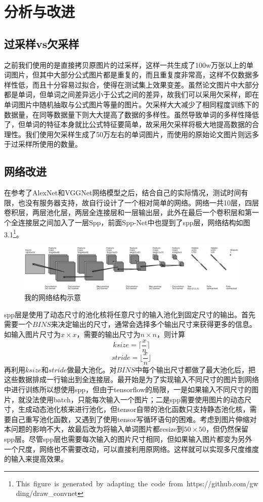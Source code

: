 \chapter{分析与改进}

\section{过采样vs欠采样}

之前我们使用的是直接拷贝原图片的过采样，这样一共生成了100w万张以上的单词图片，但其中大部分公式图片都是重复的，而且重复度非常高，这样不仅数据多样性低，而且十分容易过拟合，使得在测试集上效果变差。虽然论文图片中大部分都是单词，但单词之间差异远小于公式之间的差异，故我们可以采用欠采样，即在单词图片中随机抽取与公式图片等量的图片。欠采样大大减少了相同程度训练下的数据量，在同等数据量下则大大提高了数据的多样性。虽然导致单词的多样性降低了，但单词的特征本身就比公式特征要简单，故采用欠采样将极大地提高数据的合理性。我们使用欠采样生成了50万左右的单词图片，而使用的原始论文图片则远多于过采样所使用的数量。

\section{网络改进}
\noindent

在参考了AlexNet和VGGNet网络模型之后，结合自己的实际情况，测试时间有限，也没有服务器支持，故自行设计了一个相对简单的网络。网络一共10层，四层卷积层，两层池化层，两层全连接层和一层输出层，此外在最后一个卷积层和第一个全连接层之间加入了一层Spp，前面Spp-Net中也提到了spp层，网络结构如图3.1\footnote{\hbox{This figure is generated by adapting the code from https://github.com/gwding/draw\_convnet}}。
\begin{figure}[ht]
    \centering
    \hbox{\includegraphics[scale=0.5]{eps/mynet.eps}}
    \caption{我的网络结构示意}
    \label{fig:label}
\end{figure}
spp层是使用了动态尺寸的池化核将任意尺寸的输入池化到固定尺寸的输出。首先需要一个$BINS$来决定输出的尺寸，通常会选择多个输出尺寸来获得更多的信息。如输入图片尺寸为$x \times x$，需要的输出尺寸为$n \times n$，则计算
$$ksize = \lceil \frac x n \rceil$$
$$stride = \lfloor \frac x n \rfloor$$
再利用$ksize$和$stride$做最大池化。对$BINS$中每个输出尺寸都做了最大池化后，把这些数据排成一行输出到全连接层。\cite{spp}最开始是为了实现输入不同尺寸的图片到网络中进行训练所以想使用spp，但由于tensorflow的局限，一是如果输入不同尺寸的图片，就没法使用batch，只能每次输入一个图片；二是spp需要使用图片的动态尺寸，生成动态池化核来进行池化，但tensor自带的池化函数只支持静态池化核，需要自己重写池化函数，又遇到了使用tensor写循环语句的困难。考虑到图片伸缩对本问题的影响不大，故最后改为将输入单词图片都resize到$50 \times 50$，但仍然保留spp层。尽管spp层也需要每次输入的图片尺寸相同，但如果输入图片都变为另外一个尺度，网络也不需要改动，可以直接利用原网络。这样就可以实现多尺度维度的输入来提高效果。

